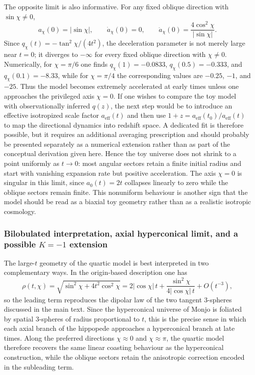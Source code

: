 \documentclass[11pt]{article}
\begin{document}
The opposite limit is also informative. For any fixed oblique direction with $\sin\chi\neq0$,
\begin{equation}
a_\chi(0)=|\sin\chi|,\qquad \dot a_\chi(0)=0,\qquad \ddot a_\chi(0)=\frac{4\cos^2\chi}{|\sin\chi|}.
\end{equation}
Since $q_\chi(t)=-\tan^2\chi/(4t^2)$, the deceleration parameter is not merely large near $t=0$; it diverges to $-\infty$ for every fixed oblique direction with $\chi\neq0$. Numerically, for $\chi=\pi/6$ one finds $q_\chi(1)=-0.0833$, $q_\chi(0.5)=-0.333$, and $q_\chi(0.1)=-8.33$, while for $\chi=\pi/4$ the corresponding values are $-0.25$, $-1$, and $-25$. Thus the model becomes extremely accelerated at early times unless one approaches the privileged axis $\chi=0$. If one wishes to compare the toy model with observationally inferred $q(z)$, the next step would be to introduce an effective isotropized scale factor $a_{\mathrm{eff}}(t)$ and then use $1+z=a_{\mathrm{eff}}(t_0)/a_{\mathrm{eff}}(t)$ to map the directional dynamics into redshift space. A dedicated fit is therefore possible, but it requires an additional averaging prescription and should probably be presented separately as a numerical extension rather than as part of the conceptual derivation given here.
Hence the toy universe does not shrink to a point uniformly as $t\to0$: most angular sectors retain a finite initial radius and start with vanishing expansion rate but positive acceleration. The axis $\chi=0$ is singular in this limit, since $a_0(t)=2t$ collapses linearly to zero while the oblique sectors remain finite. This nonuniform behaviour is another sign that the model should be read as a biaxial toy geometry rather than as a realistic isotropic cosmology.


\subsubsection*{Bilobulated interpretation, axial hyperconical limit, and a possible $K=-1$ extension}

The large-$t$ geometry of the quartic model is best interpreted in two complementary ways. In the origin-based description one has
\begin{equation}
\rho(t,\chi)=\sqrt{\sin^2\chi+4t^2\cos^2\chi}
=2|{\cos\chi}|\,t+\frac{\sin^2\chi}{4|{\cos\chi}|\,t}+O(t^{-3}),
\end{equation}
so the leading term reproduces the dipolar law of the two tangent $3$-spheres discussed in the main text. Since the hyperconical universe of Monjo is foliated by spatial $3$-spheres of radius proportional to $t$, this is the precise sense in which each axial branch of the hippopede approaches a hyperconical branch at late times. Along the preferred directions $\chi\approx0$ and $\chi\approx\pi$, the quartic model therefore recovers the same linear coasting behaviour as the hyperconical construction, while the oblique sectors retain the anisotropic correction encoded in the subleading term.
\end{document}
